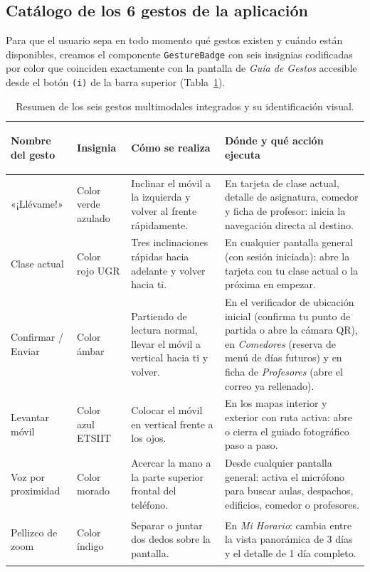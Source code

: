 \documentclass[11pt,a4paper]{article}
\begin{document}
\subsection{Catálogo de los 6 gestos de la aplicación}
Para que el usuario sepa en todo momento qué gestos existen y cuándo están disponibles, creamos el componente \texttt{GestureBadge} con seis insignias codificadas por color que coinciden exactamente con la pantalla de \textit{Guía de Gestos} accesible desde el botón \texttt{(i)} de la barra superior (Tabla~\ref{tab:gestos}).

\begin{table}[H]
\centering
\footnotesize
\renewcommand{\arraystretch}{1.15}
\begin{tabularx}{\textwidth}{>{\bfseries\raggedright\arraybackslash}p{2.5cm} >{\raggedright\arraybackslash}p{1.8cm} >{\raggedright\arraybackslash}p{3.4cm} X}
\toprule
\textbf{Nombre del gesto} & \textbf{Insignia} & \textbf{Cómo se realiza} & \textbf{Dónde y qué acción ejecuta} \\
\midrule
«¡Llévame!» & Color verde azulado & Inclinar el móvil a la izquierda y volver al frente rápidamente. & En tarjeta de clase actual, detalle de asignatura, comedor y ficha de profesor: inicia la navegación directa al destino. \\
Clase actual & Color rojo UGR & Tres inclinaciones rápidas hacia adelante y volver hacia ti. & En cualquier pantalla general (con sesión iniciada): abre la tarjeta con tu clase actual o la próxima en empezar. \\
Confirmar / Enviar & Color ámbar & Partiendo de lectura normal, llevar el móvil a vertical hacia ti y volver. & En el verificador de ubicación inicial (confirma tu punto de partida o abre la cámara QR), en \textit{Comedores} (reserva de menú de días futuros) y en ficha de \textit{Profesores} (abre el correo ya rellenado). \\
Levantar móvil & Color azul ETSIIT & Colocar el móvil en vertical frente a los ojos. & En los mapas interior y exterior con ruta activa: abre o cierra el guiado fotográfico paso a paso. \\
Voz por proximidad & Color morado & Acercar la mano a la parte superior frontal del teléfono. & Desde cualquier pantalla general: activa el micrófono para buscar aulas, despachos, edificios, comedor o profesores. \\
Pellizco de zoom & Color índigo & Separar o juntar dos dedos sobre la pantalla. & En \textit{Mi Horario}: cambia entre la vista panorámica de 3 días y el detalle de 1 día completo. \\
\bottomrule
\end{tabularx}
\caption{Resumen de los seis gestos multimodales integrados y su identificación visual.}
\label{tab:gestos}
\end{table}
\end{document}
